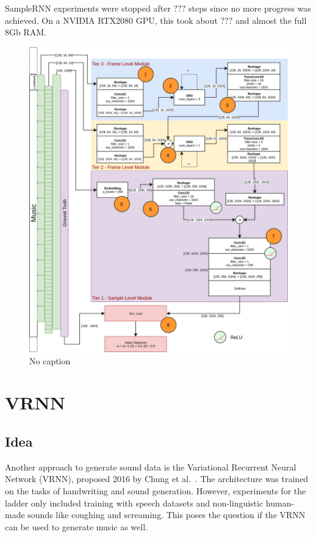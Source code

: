 \documentclass[12pt]{article}
\begin{document}
SampleRNN experiments were stopped after $???$ steps since no more progress was achieved.
On a NVIDIA RTX2080 GPU, this took about $???$ and almost the full 8Gb RAM.

\begin{figure}[ht!]
    \includegraphics[width=\textwidth]{img/samplernn-arch.png}
    \caption{No caption} %
    \label{fig:samplernn-arch}
\end{figure}



\section{VRNN}

\subsection{Idea}
Another approach to generate sound data is the Variational Recurrent Neural Network (VRNN), proposed 2016 by Chung et al.~\cite{chung2015recurrent}.
The architecture was trained on the tasks of handwriting and sound generation.
However, experiments for the ladder only included training with speech datasets and non-linguistic human-made sounds like coughing and screaming.
This poses the question if the VRNN can be used to generate music as well.
\end{document}
